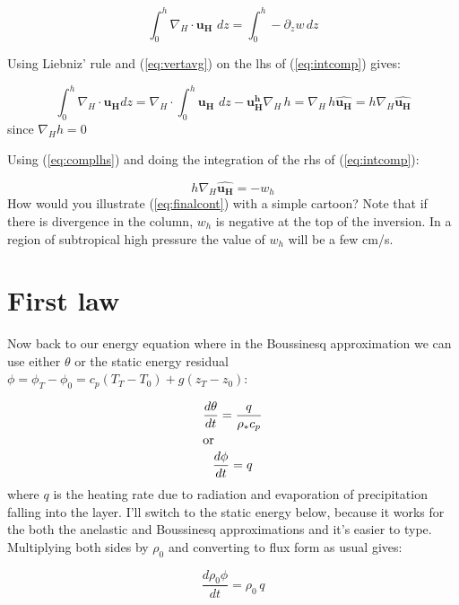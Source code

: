 \documentclass[12pt]{article}
\newcommand{\vect}[1]{\mathbf{{#1}}}
\begin{document}
\begin{equation}
  \label{eq:intcomp}
 \int_0^h \nabla_H \cdot \vect{u_H} \, \, dz = \int_0^h -\partial_z w \, dz
\end{equation}

Using Liebniz' rule and (\ref{eq:vertavg}) on the lhs of (\ref{eq:intcomp}) gives:

\begin{equation}
  \label{eq:complhs}
  \int_0^h \nabla_H \cdot \vect{u_H}   dz = \nabla_H \cdot \int_0^h \vect{u_H} \,\,dz
               - \vect{u^h_H} \nabla_H\, h = \nabla_H \, h \widehat{\vect{u_H}}
= h \nabla_H \widehat{\vect{u_H}}
\end{equation}
since $\nabla_H h = 0$

Using (\ref{eq:complhs}) and doing the integration of the rhs of (\ref{eq:intcomp}):

\begin{equation}
  \label{eq:finalcont}
  h \nabla_H \widehat{\vect{u_H}} = -w_h
\end{equation}
How would you illustrate (\ref{eq:finalcont}) with a simple cartoon? Note that if there
is divergence in the column, $w_h$ is negative at the top of the inversion.  In a region of subtropical
high pressure the value of $w_h$ will be a few cm/s.

\section{First law}
\label{sec:first-law}

Now back to our energy equation where in the Boussinesq approximation we
can use either $\theta$ or the static energy residual 
$\phi = \phi_T - \phi_0 = c_p (T_T - T_0 ) + g (z_T - z_0)$:

\begin{gather}
  \label{eq:first}
  \frac{d \theta}{dt} = \frac{q }{\rho_* c_p}\\
\intertext{or}
\frac{d \phi}{dt} = q
\end{gather}
where $q$ is the heating rate due to radiation and evaporation of
precipitation falling into the layer.  I'll switch to the static
energy below, because it works for the both the anelastic
and Boussinesq approximations and it's easier to type.
Multiplying both sides by
$\rho_0$ and converting to flux form as usual gives:

\begin{equation}
  \label{eq:firsts}
  \frac{d \rho_0 \phi}{dt} = \rho_0\, q
\end{equation}
\end{document}
